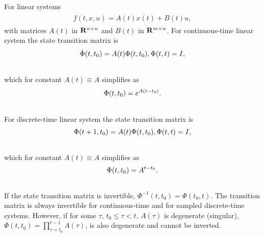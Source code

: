 \documentclass[letterpaper,10pt,english]{sphinxmanual}
\begin{document}
For linear systems
\label{chap_reach:equation-linearrhs}\begin{gather}
\begin{split}f(t, x, u) = A(t)x(t) + B(t)u,\end{split}\label{chap_reach-linearrhs}
\end{gather}
with matrices $A(t)$ in ${\bf R}^{n\times n}$ and
$B(t)$ in ${\bf R}^{m\times n}$. For continuous-time linear
system the state transition matrix is
\begin{gather}
\begin{split}\dot{\Phi}(t, t_0) = A(t)\Phi(t, t_0), \Phi(t, t) = I,\end{split}\notag\\\begin{split}\end{split}\notag
\end{gather}
which for constant $A(t)\equiv A$ simplifies as
\begin{gather}
\begin{split}\Phi(t, t_0) = e^{A(t-t_0)} .\end{split}\notag\\\begin{split}\end{split}\notag
\end{gather}
For discrete-time linear system the state transition matrix is
\begin{gather}
\begin{split}\Phi(t+1, t_0) = A(t)\Phi(t, t_0), \Phi(t, t) = I,\end{split}\notag\\\begin{split}\end{split}\notag
\end{gather}
which for constant $A(t)\equiv A$ simplifies as
\begin{gather}
\begin{split}\Phi(t, t_0) = A^{t-t_0} .\end{split}\notag\\\begin{split}\end{split}\notag
\end{gather}
If the state transition matrix is invertible,
$\Phi^{-1}(t, t_0) = \Phi(t_0, t)$. The transition matrix is
always invertible for continuous-time and for sampled discrete-time
systems. However, if for some $\tau$, $t_0\leqslant\tau<t$,
$A(\tau)$ is degenerate (singular),
$\Phi(t, t_0)=\prod_{\tau=t_0}^{t-1}A(\tau)$, is also degenerate
and cannot be inverted.
\end{document}
